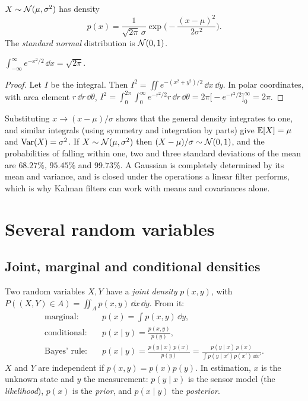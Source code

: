 \begin{definition}
$X \sim \mathcal{N}(\mu, \sigma^2)$ has density
\begin{equation}
  p(x) = \frac{1}{\sqrt{2\pi}\,\sigma}\exp\!\Big(-\frac{(x - \mu)^2}{2\sigma^2}\Big).
\end{equation}
The \emph{standard normal} distribution is $\mathcal{N}(0, 1)$.
\end{definition}

\begin{proposition}[Normalization]
$\int_{-\infty}^\infty e^{-x^2/2}\,\dd x = \sqrt{2\pi}$.
\end{proposition}
\begin{proof}
Let $I$ be the integral. Then $I^2 = \iint e^{-(x^2 + y^2)/2}\,\dd x\,\dd y$. In polar coordinates, with area element $r\,\dd r\,\dd\theta$,
$I^2 = \int_0^{2\pi}\!\int_0^\infty e^{-r^2/2}r\,\dd r\,\dd\theta = 2\pi\big[-e^{-r^2/2}\big]_0^\infty = 2\pi$.
\end{proof}

Substituting $x \to (x - \mu)/\sigma$ shows that the general density integrates to one, and similar integrals (using symmetry and
integration by parts) give $\mathbb{E}[X] = \mu$ and $\operatorname{Var}(X) = \sigma^2$. If $X \sim \mathcal{N}(\mu, \sigma^2)$ then $(X - \mu)/\sigma \sim \mathcal{N}(0, 1)$, and the
probabilities of falling within one, two and three standard deviations of the mean are $68.27\%$, $95.45\%$ and $99.73\%$. A Gaussian is
completely determined by its mean and variance, and is closed under the operations a linear filter performs, which is why Kalman
filters can work with means and covariances alone.

\section{Several random variables}

\subsection{Joint, marginal and conditional densities}

Two random variables $X, Y$ have a \emph{joint density} $p(x, y)$, with $P((X, Y) \in A) = \iint_Ap(x, y)\,\dd x\,\dd y$. From it:
\begin{align}
  \text{marginal:}&\quad p(x) = \int p(x, y)\,\dd y, \\
  \text{conditional:}&\quad p(x\mid y) = \frac{p(x, y)}{p(y)}, \\
  \text{Bayes' rule:}&\quad p(x\mid y) = \frac{p(y\mid x)\,p(x)}{p(y)} = \frac{p(y\mid x)\,p(x)}{\int p(y\mid x')p(x')\,\dd x'} .
\end{align}
$X$ and $Y$ are independent if $p(x, y) = p(x)p(y)$. In estimation, $x$ is the unknown state and $y$ the measurement: $p(y\mid x)$ is the
sensor model (the \emph{likelihood}), $p(x)$ is the \emph{prior}, and $p(x\mid y)$ the \emph{posterior}.

